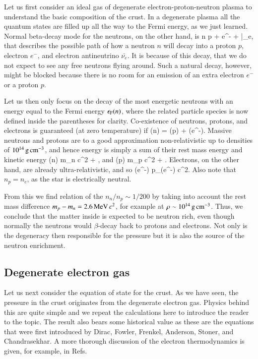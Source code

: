 Let us first consider an ideal gas of degenerate electron-proton-neutron plasma to understand the basic composition of the crust.\cite[see e.g.][]{Phillips94}
In a degenerate plasma all the quantum states are filled up all the way to the Fermi energy, as we just learned.
Normal beta-decay mode for the neutrons, on the other hand, is 
\be
n \rightarrow p + e^{-} + \bar{\nu_{e}},
\ee
that describes the possible path of how a neutron $n$ will decay into a proton $p$, electron $e^{-}$, and electron antineutrino $\bar{\nu_{e}}$.
It is because of this decay, that we do not expect to see any free neutrons flying around.
Such a natural decay, however, might be blocked because there is no room for an emission of an extra electron $e^{-}$ or a proton $p$.

Let us then only focus on the decay of the most energetic neutrons with an energy equal to the Fermi energy $\epsilon_{\mathrm{F}} (n)$, where the related particle species is now defined inside the parentheses for clarity.
Co-existence of neutrons, protons, and electrons is guaranteed (at zero temperature) if 
\be
\ef(n) = \ef(p) + \ef(e^{-}).
\ee
Massive neutrons and protons are to a good approximation non-relativistic up to densities of $10^{14}\, \mathrm{g}\,\mathrm{cm}^{-3}$, and hence energy is simply a sum of their rest mass energy and kinetic energy
\be
\ef(n) \approx m_n c^2 + ,
\ee
and
\be
\ef(p) \approx m_p c^2 + .
\ee
Electrons, on the other hand, are already ultra-relativistic, and so
\be
\ef(e^{-}) \approx p_{}(e^{-}) c^2.
\ee
Also note that $n_p = n_e$, as the star is electrically neutral.

From this we find relation of the $n_n/n_p \sim 1/200$ by taking into account the rest mass difference $m_p - m_n = 2.6 \, \mathrm{MeV}\, c^2$, for example at $\rho \sim 10^{14} \, \mathrm{g}\,\mathrm{cm}^{-3}$.
Thus, we conclude that the matter inside is expected to be neutron rich, even though normally the neutrons would $\beta$-decay back to protons and electrons.
Not only is the degeneracy then responsible for the pressure but it is also the source of the neutron enrichment. 


\subsection{Degenerate electron gas}
Let us next consider the equation of state for the crust.
As we have seen, the pressure in the crust originates from the degenerate electron gas.
Physics behind this are quite simple and we repeat the calculations here to introduce the reader to the topic.
The result also bears some historical value as these are the equations that were first introduced by Dirac\cite{Dirac25}, Fowler\cite{Fowler26}, Frenkel\cite{Frenkel28}, Anderson\cite{Anderson29}, Stoner\cite{Stoner30}, and Chandrasekhar\cite{Cha31}.
A more thorough discussion of the electron thermodynamics is given, for example, in Refs.\cite{Cha39, Schatzman58, Salpeter61, Tooper69, ZN71, LL80, Blinnikov87, YS89, HPY07}

